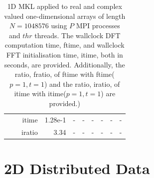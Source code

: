 \documentclass[a4paper]{article}
\begin{document}
\begin{table}[htbp]
\begin{center}
\begin{small}
\begin{tabular}{|r|r|r|r|r|r|r|r|r|r|}
           &          & itime &   1.28e-1 &  - &  - &  - &  - &  - &  - \\
           &          & iratio &   3.34 &  - &  - &  - &  - &  - &  - \\\hline
   \end{tabular}
\caption{1D MKL applied to real and complex valued one-dimensional arrays of length $N=1048576$ using $P$ MPI processes and $thr$ threads. The wallclock DFT computation time, ftime, and wallclock FFT initialisation time, itime, both in seconds, are provided. Additionally, the ratio, fratio, of ftime  with ftime($p=1,t=1$) and the ratio, iratio, of itime  with itime($p=1,t=1$) are provided.) }\label{Tbl:MKL1d1048576}
\end{small}
\end{center}
\end{table}

\clearpage

\section{2D Distributed Data}\label{App:2Ddist}
\end{document}
